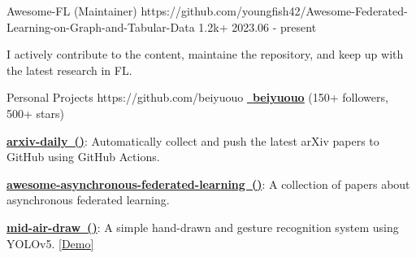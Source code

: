 \begin{cventries}

\cvproject
{Awesome-FL (Maintainer)} %
{https://github.com/youngfish42/Awesome-Federated-Learning-on-Graph-and-Tabular-Data}
{1.2k+} %
{2023.06 - present} %
{
\begin{cvitems} %
\item {I actively contribute to the content, maintaine the repository, and keep up with the latest research in FL. }
\end{cvitems}
} %





\cvproject
{Personal Projects} %
{https://github.com/beiyuouo} %
{} %
{\href{https://github.com/beiyuouo}{\textcolor{text}{\faGithub~\textbf{\underline{beiyuouo}}}} (150+ followers, 500+ stars)} %
{
\begin{cvitems} %
\item {\href{https://github.com/beiyuouo/arxiv-daily}{\textbf{arxiv-daily~()}}: Automatically collect and push the latest arXiv papers to GitHub using GitHub Actions.}
\item {\href{https://github.com/beiyuouo/awesome-asynchronous-federated-learning}{\textbf{awesome-asynchronous-federated-learning~()}}: A collection of papers about asynchronous federated learning.}
\item {\href{https://github.com/beiyuouo/mid-air-draw}{\textbf{mid-air-draw~()}}: A simple hand-drawn and gesture recognition system using YOLOv5. \textcolor{awesome-red}{\href{https://www.bilibili.com/video/BV15V411a7WB/}{[Demo]}}}
\end{cvitems}
} %


\end{cventries}
